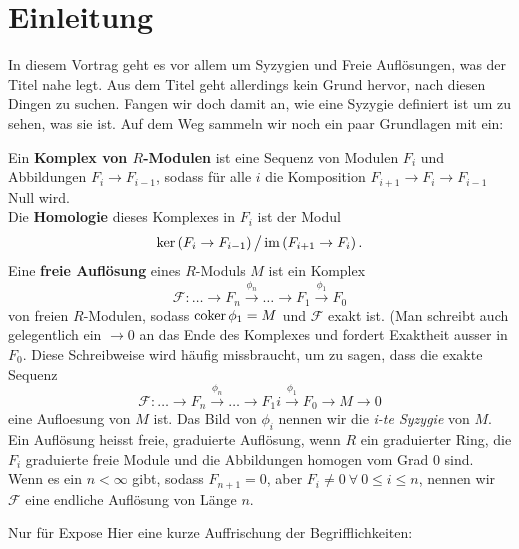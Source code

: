 \documentclass{article}
\begin{document}
\maketitle 

\section{Einleitung}
	In diesem Vortrag geht es vor allem um Syzygien und Freie Aufl\"osungen, 
	was der Titel nahe legt.
	Aus dem Titel geht allerdings kein Grund hervor, 
	nach diesen Dingen zu suchen.
	Fangen wir doch damit an, 
	wie eine Syzygie definiert ist um zu sehen,
	was sie ist.
	Auf dem Weg sammeln wir noch ein paar Grundlagen mit ein:
	\begin{defn}[\nocite{Eis1} ]
		Ein \textbf{Komplex von \( R \)-Modulen} 
		ist eine Sequenz von Modulen 
		\( F_{i} \)
		und Abbildungen
		\( F_{i} \to F_{i-1} \),
		sodass f\"ur alle 
		\( i \) 
		die Komposition
		\( F_{i+1} \to F_{i} \to F_{i-1} \)
		Null wird. \\
		Die \textbf{Homologie} dieses Komplexes in 
		\( F_{i} \)
		ist der  Modul
		\[
			\ker\left( F_{i} \to F_{i-1 } \right) \big/ 
			\operatorname{im} \left( F_{i+1} \to F_{i} \right).
		\]		
		Eine \textbf{freie Aufl\"osung} eines 
		\(R\)-Moduls 
		\(M\)
		ist ein Komplex
		\[
			\mathcal{F}: \dots \to F_{n} 
			\overset{\phi_{n}}{\to} 
			\dots \to F_{1}
			\overset{\phi_{1}}{\to} F_{0}
		\]
		von freien
		\(R\)-Modulen, sodass 
		\( \operatorname{coker} \phi_{1} = M \)
		und
		\( \mathcal{F} \)
		exakt ist.
		(Man schreibt auch gelegentlich ein 
		\( \to 0 \) 
		an das Ende des Komplexes
		und fordert Exaktheit ausser in 
		\( F_{0} \).
		Diese Schreibweise wird h\"aufig missbraucht,
		um zu sagen, 
		dass die exakte Sequenz
		\[
			\mathcal{F}: \dots \to F_{n} 
			\overset{\phi_{n}}{\to} 
			\dots \to F_{1}i
			\overset{\phi_{1}}{\to} F_{0}
			\to M 
			\to 0
		\]
		eine Aufloesung von 
		\(M \)
		ist.
		Das Bild von
		\( \phi_{i} \)
		nennen wir die
		\emph{i-te Syzygie} 
		von 
		\( M \).\\
		Ein Aufl\"osung heisst freie, graduierte Aufl\"osung,
		wenn 
		\( R \) ein graduierter Ring,
		die 
		\( F_{i} \)
		graduierte freie Module
		und die Abbildungen homogen vom Grad 0 sind.
		Wenn es ein
		\( n < \infty \) 
		gibt, sodass 
		\(F_{n+1}=0 \),
		aber 
		\( F_{i} \neq 0 \ \forall \ 0 \le i \le n \),
		nennen wir 
		\( \mathcal{F} \) 
		eine endliche Aufl\"osung von L\"ange 
		\( n \).
	\end{defn}
	{\color{red}Nur f\"ur Expose}
	Hier eine kurze Auffrischung der Begrifflichkeiten:
\end{document}
